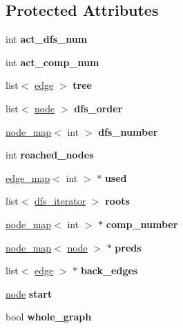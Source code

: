 \subsection*{Protected Attributes}
\begin{DoxyCompactItemize}
\item 
\mbox{\label{classdfs_aedaf2b485ff83150b1de6c305922473b}} 
int {\bfseries act\+\_\+dfs\+\_\+num}
\item 
\mbox{\label{classdfs_ab0251ac30adfd569e214a64db7f3a905}} 
int {\bfseries act\+\_\+comp\+\_\+num}
\item 
\mbox{\label{classdfs_ac1f76ebbcb2489fb6456abf6791aa2f2}} 
list$<$ \mbox{\hyperlink{classedge}{edge}} $>$ {\bfseries tree}
\item 
\mbox{\label{classdfs_a7654d7b912b2c66cc5c483774e224803}} 
list$<$ \mbox{\hyperlink{classnode}{node}} $>$ {\bfseries dfs\+\_\+order}
\item 
\mbox{\label{classdfs_a99727f2274d6af63daae4f0518f3adbe}} 
\mbox{\hyperlink{classnode__map}{node\+\_\+map}}$<$ int $>$ {\bfseries dfs\+\_\+number}
\item 
\mbox{\label{classdfs_acb11186a1a2a2a1f38cdc0674340ba37}} 
int {\bfseries reached\+\_\+nodes}
\item 
\mbox{\label{classdfs_afc18288747491be301d6d8d85d8f220b}} 
\mbox{\hyperlink{classedge__map}{edge\+\_\+map}}$<$ int $>$ $\ast$ {\bfseries used}
\item 
\mbox{\label{classdfs_a85b090809ab552355cbb2722558eccd4}} 
list$<$ \mbox{\hyperlink{classdfs_ad040ddae37492e18c8e029406d667bd9}{dfs\+\_\+iterator}} $>$ {\bfseries roots}
\item 
\mbox{\label{classdfs_a00db016ac7eab69045cae408008890c1}} 
\mbox{\hyperlink{classnode__map}{node\+\_\+map}}$<$ int $>$ $\ast$ {\bfseries comp\+\_\+number}
\item 
\mbox{\label{classdfs_a3fdeb5a211a1bc1753b2a637258c5355}} 
\mbox{\hyperlink{classnode__map}{node\+\_\+map}}$<$ \mbox{\hyperlink{classnode}{node}} $>$ $\ast$ {\bfseries preds}
\item 
\mbox{\label{classdfs_a109335d8c9e025a427177b30e25a18d5}} 
list$<$ \mbox{\hyperlink{classedge}{edge}} $>$ $\ast$ {\bfseries back\+\_\+edges}
\item 
\mbox{\label{classdfs_af677cfc31fe06a18dd3a3aae7f7d112b}} 
\mbox{\hyperlink{classnode}{node}} {\bfseries start}
\item 
\mbox{\label{classdfs_ab8342c80ab208ef0e0d781f0769d0d95}} 
bool {\bfseries whole\+\_\+graph}
\end{DoxyCompactItemize}



